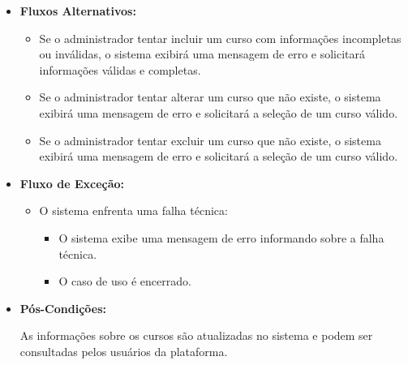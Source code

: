 \begin{itemize}
\begin{itemize}
\begin{itemize}
\begin{itemize}
            \end{itemize}
        \end{itemize}
        \item \textbf{Fluxos Alternativos:}
        \begin{itemize}
            \item Se  o administrador tentar incluir um curso com informações incompletas ou inválidas, o sistema exibirá uma mensagem de erro e solicitará informações válidas e completas.
            \item Se o administrador tentar alterar um curso que não existe, o sistema exibirá uma mensagem de erro e solicitará a seleção de um curso válido.
            \item Se  o administrador tentar excluir um curso que não existe, o sistema exibirá uma mensagem de erro e solicitará a seleção de um curso válido.
        \end{itemize}
        \item \textbf{Fluxo de Exceção:}
        \begin{itemize}
            \item O sistema enfrenta uma falha técnica:
            \begin{itemize}
                \item O sistema exibe uma mensagem de erro informando sobre a falha técnica.
                \item O caso de uso é encerrado.
            \end{itemize}
        \end{itemize}
        \item \textbf{Pós-Condições:}

        As informações sobre os cursos são atualizadas no sistema e podem ser consultadas pelos usuários da plataforma.
    \end{itemize}
\end{itemize}

